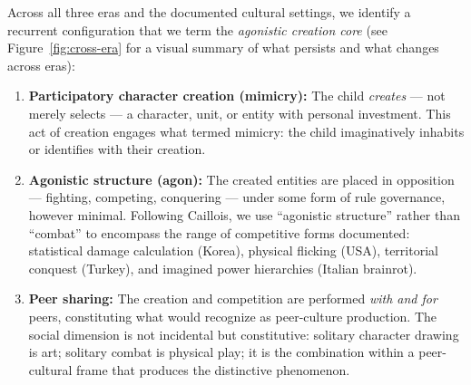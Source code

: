 \documentclass[12pt]{article}
\begin{document}
Across all three eras and the documented cultural settings, we identify a recurrent configuration that we term the \emph{agonistic creation core} (see Figure~\ref{fig:cross-era} for a visual summary of what persists and what changes across eras):

\begin{enumerate}[leftmargin=*]
    \item \textbf{Participatory character creation (mimicry):} The child \emph{creates} --- not merely selects --- a character, unit, or entity with personal investment. This act of creation engages what \citet{caillois1961} termed mimicry: the child imaginatively inhabits or identifies with their creation.

    \item \textbf{Agonistic structure (agon):} The created entities are placed in opposition --- fighting, competing, conquering --- under some form of rule governance, however minimal. Following Caillois, we use ``agonistic structure'' rather than ``combat'' to encompass the range of competitive forms documented: statistical damage calculation (Korea), physical flicking (USA), territorial conquest (Turkey), and imagined power hierarchies (Italian brainrot).

    \item \textbf{Peer sharing:} The creation and competition are performed \emph{with and for} peers, constituting what \citet{corsaro2005} would recognize as peer-culture production. The social dimension is not incidental but constitutive: solitary character drawing is art; solitary combat is physical play; it is the combination within a peer-cultural frame that produces the distinctive phenomenon.
\end{enumerate}
\end{document}
